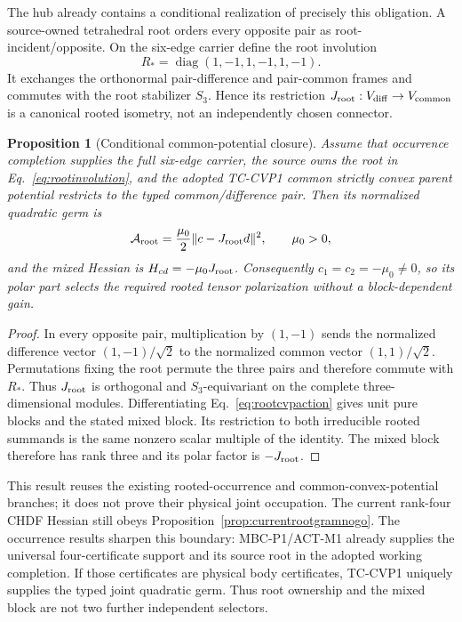 \documentclass[11pt]{article}
\newtheorem{proposition}{Proposition}
\begin{document}
The hub already contains a conditional realization of precisely this
obligation. A source-owned tetrahedral root orders every opposite pair as
root-incident/opposite. On the six-edge carrier define the root involution
\begin{equation}
 R_*=\operatorname{diag}(1,-1,1,-1,1,-1).
 \label{eq:rootinvolution}
\end{equation}
It exchanges the orthonormal pair-difference and pair-common frames and
commutes with the root stabilizer $S_3$. Hence its restriction
$J_{\rm root}:V_{\rm diff}\to V_{\rm common}$ is a canonical rooted isometry,
not an independently chosen connector.

\begin{proposition}[Conditional common-potential closure]
\label{prop:rootcvpclosure}
Assume that occurrence completion supplies the full six-edge carrier, the
source owns the root in Eq.~\eqref{eq:rootinvolution}, and the adopted
TC-CVP1 common strictly convex parent potential restricts to the typed
common/difference pair. Then its normalized quadratic germ is
\begin{equation}
 \mathcal A_{\rm root}
 =\frac{\mu_0}{2}\|c-J_{\rm root}d\|^2,
 \qquad \mu_0>0,
 \label{eq:rootcvpaction}
\end{equation}
and the mixed Hessian is
$H_{cd}=-\mu_0J_{\rm root}$. Consequently
$c_1=c_2=-\mu_0\ne0$, so its polar part selects the required rooted tensor
polarization without a block-dependent gain.
\end{proposition}

\begin{proof}
In every opposite pair, multiplication by $(1,-1)$ sends the normalized
difference vector $(1,-1)/\sqrt2$ to the normalized common vector
$(1,1)/\sqrt2$. Permutations fixing the root permute the three pairs and
therefore commute with $R_*$. Thus $J_{\rm root}$ is orthogonal and
$S_3$-equivariant on the complete three-dimensional modules. Differentiating
Eq.~\eqref{eq:rootcvpaction} gives unit pure blocks and the stated mixed
block. Its restriction to both irreducible rooted summands is the same
nonzero scalar multiple of the identity. The mixed block therefore has rank
three and its polar factor is $-J_{\rm root}$.
\end{proof}

This result reuses the existing rooted-occurrence and common-convex-potential
branches; it does not prove their physical joint occupation. The current
rank-four CHDF Hessian still obeys Proposition~\ref{prop:currentrootgramnogo}.
The occurrence results sharpen this boundary: MBC-P1/ACT-M1 already supplies
the universal four-certificate support and its source root in the adopted
working completion. If those certificates are physical body certificates,
TC-CVP1 uniquely supplies the typed joint quadratic germ. Thus root ownership
and the mixed block are not two further independent selectors.
\end{document}
